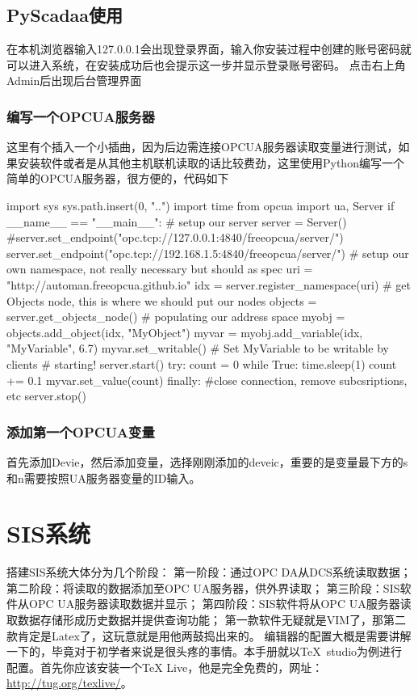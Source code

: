 \subsection{PyScadaa使用}
在本机浏览器输入127.0.0.1会出现登录界面，输入你安装过程中创建的账号密码就可以进入系统，在安装成功后也会提示这一步并显示登录账号密码。
点击右上角Admin后出现后台管理界面
\subsubsection{编写一个OPCUA服务器}
这里有个插入一个小插曲，因为后边需连接OPCUA服务器读取变量进行测试，如果安装软件或者是从其他主机联机读取的话比较费劲，这里使用Python编写一个简单的OPCUA服务器，很方便的，代码如下
\begin{shell}
import sys
sys.path.insert(0, "..")
import time
from opcua import ua, Server
if __name__ == "__main__":
    # setup our server
    server = Server()
    #server.set_endpoint("opc.tcp://127.0.0.1:4840/freeopcua/server/")
    server.set_endpoint("opc.tcp://192.168.1.5:4840/freeopcua/server/")
    # setup our own namespace, not really necessary but should as spec
    uri = "http://automan.freeopcua.github.io"
    idx = server.register_namespace(uri)
    # get Objects node, this is where we should put our nodes
    objects = server.get_objects_node()
    # populating our address space
    myobj = objects.add_object(idx, "MyObject")
    myvar = myobj.add_variable(idx, "MyVariable", 6.7)
    myvar.set_writable()    # Set MyVariable to be writable by clients
    # starting!
    server.start()
    try:
        count = 0
        while True:
            time.sleep(1)
            count += 0.1
            myvar.set_value(count)
    finally:
        #close connection, remove subcsriptions, etc
        server.stop()
\end{shell}
\subsubsection{添加第一个OPCUA变量}
首先添加Devie，然后添加变量，选择刚刚添加的deveic，重要的是变量最下方的s和n需要按照UA服务器变量的ID输入。
\section{SIS系统}
	搭建SIS系统大体分为几个阶段：
	第一阶段：通过OPC DA从DCS系统读取数据；
	第二阶段：将读取的数据添加至OPC UA服务器，供外界读取；
	第三阶段：SIS软件从OPC UA服务器读取数据并显示；
	第四阶段：SIS软件将从OPC UA服务器读取数据存储形成历史数据并提供查询功能；
	第一款软件无疑就是VIM了，那第二款肯定是Latex了，这玩意就是用他两鼓捣出来的。	编辑器的配置大概是需要讲解一下的，毕竟对于初学者来说是很头疼的事情。本手册就以\TeX\ studio为例进行配置。首先你应该安装一个\TeX{} Live，他是完全免费的，网址：\url{http://tug.org/texlive/}。
